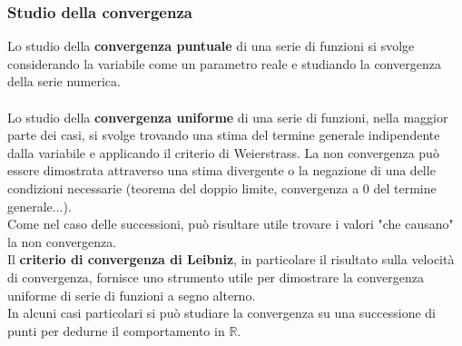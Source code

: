 \documentclass{article}
\newcommand{\R}{\mathds{R}}
\begin{document}
\subsubsection{Studio della convergenza}
Lo studio della \textbf{convergenza puntuale} di una serie di funzioni si svolge considerando la variabile come un parametro reale e studiando la convergenza della serie numerica.\\\\
Lo studio della \textbf{convergenza uniforme} di una serie di funzioni, nella maggior parte dei casi, si svolge trovando una stima del termine generale indipendente dalla variabile e applicando il criterio di Weierstrass. La non convergenza può essere dimostrata attraverso una stima divergente o la negazione di una delle condizioni necessarie (teorema del doppio limite, convergenza a 0 del termine generale...).\\
Come nel caso delle successioni, può risultare utile trovare i valori "che causano" la non convergenza.\\
Il \textbf{criterio di convergenza di Leibniz}, in particolare il risultato sulla velocità di convergenza, fornisce uno strumento utile per dimostrare la convergenza uniforme di serie di funzioni a segno alterno.\\
In alcuni casi particolari si può studiare la convergenza su una successione di punti per dedurne il comportamento in $\R$.
\end{document}
